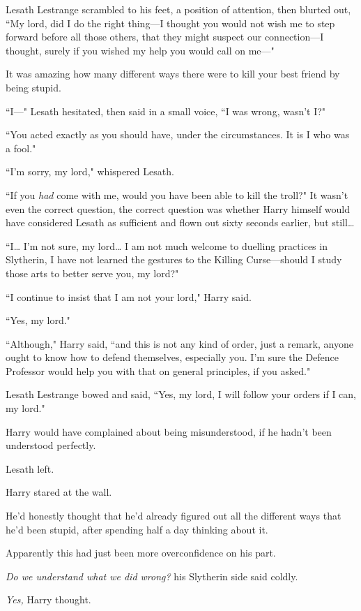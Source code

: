 Lesath Lestrange scrambled to his feet, a position of attention, then blurted out, ``My lord, did I do the right thing—I thought you would not wish me to step forward before all those others, that they might suspect our connection—I thought, surely if you wished my help you would call on me—"

It was amazing how many different ways there were to kill your best friend by being stupid.

``I—" Lesath hesitated, then said in a small voice, ``I was wrong, wasn't I?"

``You acted exactly as you should have, under the circumstances. It is I who was a fool."

``I'm sorry, my lord," whispered Lesath.

``If you \emph{had} come with me, would you have been able to kill the troll?" It wasn't even the correct question, the correct question was whether Harry himself would have considered Lesath as sufficient and flown out sixty seconds earlier, but still{\ldots}

``I{\ldots} I'm not sure, my lord{\ldots} I am not much welcome to duelling practices in Slytherin, I have not learned the gestures to the Killing Curse—should I study those arts to better serve you, my lord?"

``I continue to insist that I am not your lord," Harry said.

``Yes, my lord."

``Although," Harry said, ``and this is not any kind of order, just a remark, anyone ought to know how to defend themselves, especially you. I'm sure the Defence Professor would help you with that on general principles, if you asked."

Lesath Lestrange bowed and said, ``Yes, my lord, I will follow your orders if I can, my lord."

Harry would have complained about being misunderstood, if he hadn't been understood perfectly.

Lesath left.

Harry stared at the wall.

He'd honestly thought that he'd already figured out all the different ways that he'd been stupid, after spending half a day thinking about it.

Apparently this had just been more overconfidence on his part.

\emph{Do we understand what we did wrong?} his Slytherin side said coldly.

\emph{Yes,} Harry thought.


